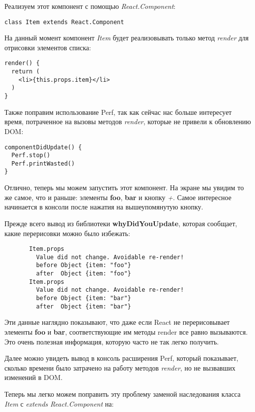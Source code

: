Реализуем этот компонент с помощью \textit{React.Component}:

\begin{lstlisting}
class Item extends React.Component
\end{lstlisting}

На данный момент компонент \textit{Item} будет реализовывать только метод \textit{render} для отрисовки элементов списка:

\begin{lstlisting}
render() {
  return (
    <li>{this.props.item}</li>
  )
}
\end{lstlisting}

Также поправим использование Perf, так как сейчас нас больше интересует время, потраченное на вызовы методов \textit{render}, которые не привели к обновлению DOM:

\begin{lstlisting}
componentDidUpdate() {
  Perf.stop()
  Perf.printWasted()
}
\end{lstlisting}

Отлично, теперь мы можем запустить этот компонент. На экране мы увидим то же самое, что и раньше: элементы \textbf{foo}, \textbf{bar} и кнопку \textit{+}. Самое интересное начинается в консоли после нажатия на вышеупомянутую кнопку.

Прежде всего вывод из библиотеки \textbf{whyDidYouUpdate}, которая сообщает, какие перерисовки можно было избежать:

\begin{lstlisting}
       Item.props 
         Value did not change. Avoidable re-render!         
         before Object {item: "foo"}
         after  Object {item: "foo"}
       Item.props
         Value did not change. Avoidable re-render!
         before Object {item: "bar"}
         after  Object {item: "bar"}
\end{lstlisting}

Эти данные наглядно показывают, что даже если React не перерисовывает элементы \textbf{foo} и \textbf{bar}, соответствующие им методы render все равно вызываются. Это очень полезная информация, которую часто не так легко получить.

Далее можно увидеть вывод в консоль расширения Perf, который показывает, сколько времени было затрачено на работу методов \textit{render}, но не вызвавших изменений в DOM. 

Теперь мы легко можем поправить эту проблему заменой наследования класса \textit{Item} с \textit{extends React.Component} на:

